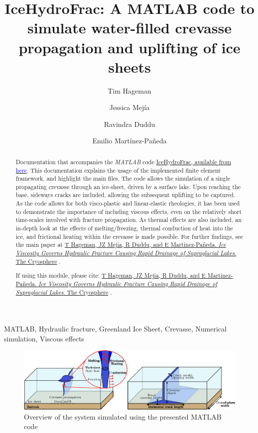 \documentclass[3p]{elsarticle} %
\newcommand{\citeMe}{\href{https://doi.org/10.5194/egusphere-2024-346}{T Hageman, JZ Mejia, R Duddu, and E {Martinez-Pa{\~n}eda}. \textit{Ice Viscosity Governs Hydraulic Fracture Causing Rapid Drainage of Supraglacial Lakes}. The Cryosphere} \citep{Hageman}}
\begin{document}
\begin{frontmatter}
\title{IceHydroFrac: A MATLAB code to simulate water-filled crevasse propagation and uplifting of ice sheets }

\author[1]{Tim Hageman }
\author[2]{Jessica Mejía}
\author[3]{Ravindra Duddu} 
\author[1]{Emilio Martínez-Pañeda}

\address[1]{Department of Engineering Science, University of Oxford, Oxford OX1 3PJ, UK}
\address[2]{Department of Geology, University at Buffalo, Buffalo, NY 14260, USA}
\address[3]{Department of Civil and Environmental Engineering, Department of Earth and Environmental Sciences, Vanderbilt University, Nashville, TN 37235, USA}

\begin{abstract}
Documentation that accompanies the \textit{MATLAB} code \href{https://github.com/T-Hageman/MATLAB_IceHydroFrac}{IceHydroFrac, available from \textcolor{blue}{here}}. This documentation explains the usage of the implemented finite element framework, and highlight the main files.  The code allows the simulation of a single propagating crevasse through an ice-sheet, driven by a surface lake. Upon reaching the base, sideways cracks are included, allowing the subsequent uplifting to be captured. As the code allows for both visco-plastic and linear-elastic rheologies, it has been used to demonstrate the importance of including viscous effects, even on the relatively short time-scales involved with fracture propagation. As thermal effects are also included, an in-depth look at the effects of melting/freezing, thermal conduction of heat into the ice, and frictional heating within the crevasse is made possible. For further findings, see the main paper at \citeMe{}. 

If using this module, please cite: \citeMe{}.
\end{abstract}

\begin{keyword}
MATLAB, Hydraulic fracture, Greenland Ice Sheet, Crevasse, Numerical simulation, Viscous effects
\end{keyword}

\end{frontmatter}

\begin{figure}
	\centering
	\includegraphics[width=16cm]{Figures/CaseOverview.eps}
	\caption{Overview of the system simulated using the presented MATLAB code}
\end{figure}
\end{document}
